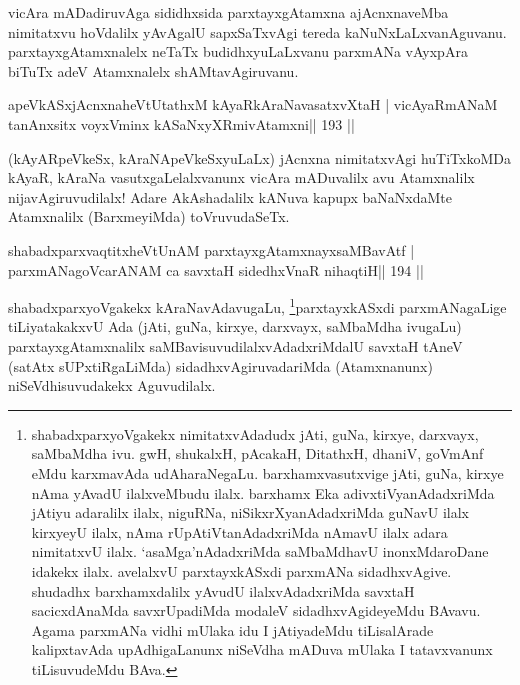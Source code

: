 \begin{artha}
vicAra mADadiruvAga sididhxsida parxtayxgAtamxna ajAcnxnaveMba nimitatxvu hoVdalilx yAvAgalU sapxSaTxvAgi tereda kaNuNxLaLxvanAguvanu. parxtayxgAtamxnalelx neTaTx budidhxyuLaLxvanu parxmANa vAyxpAra biTuTx adeV Atamxnalelx shAMtavAgiruvanu.
\end{artha}

\begin{shl}
apeVkASxjAcnxnaheVtUtathxM kAyaRkAraNavasatxvXtaH |
vicAyaRmANaM tanAnxsitx voyxVminx kASaNxyXRmivA\s\s tamxni\hfill || 193 ||
\end{shl}

\begin{artha}
(kAyARpeVkeSx, kAraNApeVkeSxyuLaLx) jAcnxna nimitatxvAgi huTiTxkoMDa   kAyaR, kAraNa vasutxgaLelalxvanunx vicAra mADuvalilx avu Atamxnalilx   nijavAgiruvudilalx! Adare AkAshadalilx  kANuva kapupx baNaNxdaMte   Atamxnalilx (BarxmeyiMda) toVruvudaSeTx.
\end{artha}


\begin{shl}
shabadxparxvaqtitxheVtUnAM parxtayxgAtamxnayxsaMBavAtf |
parxmANagoVcarANAM ca savxtaH sidedhxVnaR nihaqtiH\hfill || 194 ||
\end{shl}

\begin{artha}
shabadxparxyoVgakekx
kAraNavAdavugaLu, \footnote{shabadxparxyoVgakekx nimitatxvAdadudx
  jAti, guNa, kirxye, darxvayx, saMbaMdha ivu. gwH, shukalxH, pAcakaH,
DitathxH, dhaniV, goVmAnf eMdu karxmavAda udAharaNegaLu.
barxhamxvasutxvige jAti, guNa, kirxye nAma yAvadU ilalxveMbudu ilalx.
barxhamx Eka adivxtiVyanAdadxriMda jAtiyu adaralilx ilalx, niguRNa,
niSikxrXyanAdadxriMda guNavU ilalx kirxyeyU ilalx, nAma
rUpAtiVtanAdadxriMda nAmavU ilalx adara nimitatxvU ilalx.
`asaMga'nAdadxriMda saMbaMdhavU inonxMdaroDane idakekx
ilalx. avelalxvU parxtayxkASxdi parxmANa sidadhxvAgive. shudadhx
barxhamxdalilx yAvudU ilalxvAdadxriMda savxtaH sacicxdAnaMda savxrUpadiMda
modaleV sidadhxvAgideyeMdu BAvavu. Agama parxmANa vidhi mUlaka idu I
jAtiyadeMdu tiLisalArade kalipxtavAda upAdhigaLanunx niSeVdha mADuva
mUlaka I tatavxvanunx tiLisuvudeMdu BAva.}parxtayxkASxdi
parxmANagaLige tiLiyatakakxvU Ada (jAti, guNa, kirxye, darxvayx,
saMbaMdha ivugaLu) parxtayxgAtamxnalilx saMBavisuvudilalxvAdadxriMdalU
savxtaH tAneV (satAtx sUPxtiRgaLiMda) sidadhxvAgiruvadariMda
(Atamxnanunx) niSeVdhisuvudakekx Aguvudilalx.
\end{artha}

